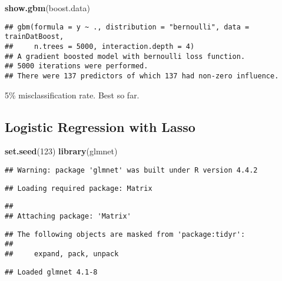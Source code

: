 \documentclass[
]{article}
\newenvironment{Shaded}{\begin{snugshade}}{\end{snugshade}}
\newcommand{\DecValTok}[1]{\textcolor[rgb]{0.00,0.00,0.81}{#1}}
\newcommand{\FunctionTok}[1]{\textcolor[rgb]{0.13,0.29,0.53}{\textbf{#1}}}
\newcommand{\NormalTok}[1]{#1}
\begin{document}
\begin{Shaded}
\begin{Highlighting}[]
\FunctionTok{show.gbm}\NormalTok{(boost.data)}
\end{Highlighting}
\end{Shaded}

\begin{verbatim}
## gbm(formula = y ~ ., distribution = "bernoulli", data = trainDatBoost, 
##     n.trees = 5000, interaction.depth = 4)
## A gradient boosted model with bernoulli loss function.
## 5000 iterations were performed.
## There were 137 predictors of which 137 had non-zero influence.
\end{verbatim}

5\% misclassification rate. Best so far.

\subsection{Logistic Regression with
Lasso}\label{logistic-regression-with-lasso}

\begin{Shaded}
\begin{Highlighting}[]
\FunctionTok{set.seed}\NormalTok{(}\DecValTok{123}\NormalTok{)}
\FunctionTok{library}\NormalTok{(glmnet)}
\end{Highlighting}
\end{Shaded}

\begin{verbatim}
## Warning: package 'glmnet' was built under R version 4.4.2
\end{verbatim}

\begin{verbatim}
## Loading required package: Matrix
\end{verbatim}

\begin{verbatim}
## 
## Attaching package: 'Matrix'
\end{verbatim}

\begin{verbatim}
## The following objects are masked from 'package:tidyr':
## 
##     expand, pack, unpack
\end{verbatim}

\begin{verbatim}
## Loaded glmnet 4.1-8
\end{verbatim}
\end{document}
